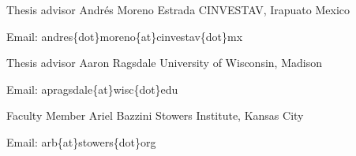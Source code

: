 


\begin{cventries}

\cventry
    {Thesis advisor}
    {Andrés Moreno Estrada}
    {CINVESTAV, Irapuato Mexico}
    {$\;$}
    {
      \begin{cvitems}
        \item {
            Email:  andres\{dot\}moreno\{at\}cinvestav\{dot\}mx
        }
      \end{cvitems}
    }
\cventry
    {Thesis advisor}
    {Aaron Ragsdale}
    {University of Wisconsin, Madison}
    {$\;$}
    {
      \begin{cvitems}
        \item {
            Email:  apragsdale\{at\}wisc\{dot\}edu
        }
      \end{cvitems}
    }

\cventry
    {Faculty Member}
    {Ariel Bazzini}
    {Stowers Institute, Kansas City}
    {$\;$}
    {
      \begin{cvitems}
        \item {
            Email:  arb\{at\}stowers\{dot\}org
        }
      \end{cvitems}
    }

\end{cventries}